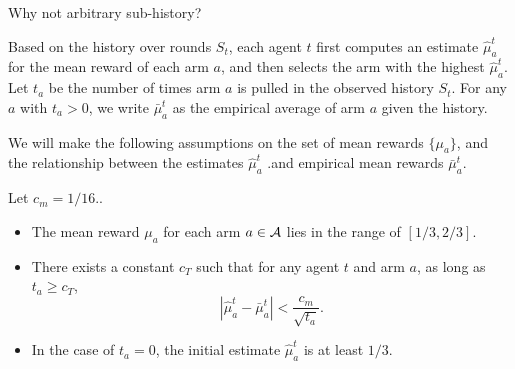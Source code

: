 \iffalse
\begin{itemize}
\item \textbf{Full history:} We show each agent the history of all previous agents' pulls. We call this policy \ALGG. 
\item \textbf{Unbiased sub-history:} We show each agent only a subset of history. The subsets are pre-determined before any arms are pulled.  
\item \textbf{Info graph:} All the recommendation policies in this paper can be described by an undirected transitive graph with $T$ nodes. We call it the info graph. The $T$ nodes in the graph represent the $T$ agents. If there is an edge between node $u$ and $v$ for $u < v$, it means the history of agent $u$ is shown to agent $v$.
\end{itemize}
\fi

\begin{remark}
  Why not arbitrary sub-history? 
\end{remark}

 Based on the history over rounds $S_t$, each
agent $t$ first computes an estimate $\hat{\mu}_a^t$ for the mean
reward of each arm $a$, and then selects the arm with the highest
$\hat{\mu}_a^t$. Let $t_a$ be the number of times arm $a$ is pulled in
the observed history $S_t$. For any $a$ with $t_a > 0$, we write
$\bar{\mu}_a^t$ as the empirical average of arm $a$ given the history.


We will make the following assumptions on the set of mean rewards
$\{\mu_a\}$, and the relationship between the estimates $\hat \mu_a^t$
.and empirical mean rewards $\bar\mu_a^t$.



\begin{assumption}
\label{ass:embehave}
Let $c_m = 1/16$.. 
\begin{itemize}
\item The mean reward $\mu_a$ for each arm $a\in \mathcal{A}$ lies in the range
  of $[1/3, 2/3]$.


\item There exists a constant $c_T$ such that for any agent $t$ and
  arm $a$, as long as $t_a \geq c_T$,
\[
  \left|\hat{\mu}^t_a - \bar{\mu}^t_a \right| <
  \frac{c_m}{\sqrt{t_a}}.
\]
\item In the case of $t_a = 0$, the initial estimate $\hat{\mu}^t_a$
  is at least $1/3$.
\end{itemize}
\end{assumption}


